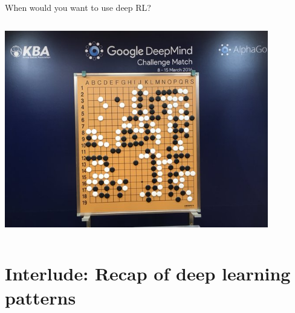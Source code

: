 \documentclass[9pt]{beamer}
\begin{document}
\begin{frame}{When would you want to use deep RL?}
\begin{columns}
\begin{column}{0.33\textwidth}
\begin{center}
     \includegraphics[width=0.9\textwidth]{alphago}
     \end{center}
\end{column}
\begin{column}{0.67\textwidth}
\end{column}
\end{columns}
\end{frame}

\section{Interlude: Recap of deep learning patterns}
\end{document}

